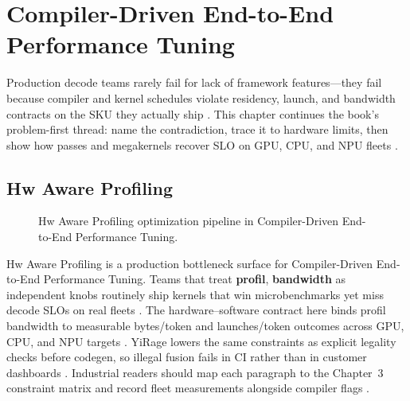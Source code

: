 \chapter{Compiler-Driven End-to-End Performance Tuning}
\label{chap:ch22}

Production decode teams rarely fail for lack of framework features---they fail because compiler and kernel schedules violate residency, launch, and bandwidth contracts on the SKU they actually ship \citep{patel2025llminference,nvidia2022hopper}. This chapter continues the book's problem-first thread: name the contradiction, trace it to hardware limits, then show how passes and megakernels recover SLO on GPU, CPU, and NPU fleets \citep{taxbreak2026,semianalysis2024tma}.

\section{Hw Aware Profiling}
\label{sec:hw_aware_profiling}
\begin{figure}[t]
\centering
{}
\caption{Hw Aware Profiling optimization pipeline in Compiler-Driven End-to-End Performance Tuning.}
\label{fig:hw_aware_profiling_pipeline}
\end{figure}


Hw Aware Profiling is a production bottleneck surface for Compiler-Driven End-to-End Performance Tuning. Teams that treat \textbf{profil}, \textbf{bandwidth} as independent knobs routinely ship kernels that win microbenchmarks yet miss decode SLOs on real fleets \citep{patel2025llminference,nvidia2022hopper}. The hardware--software contract here binds profil bandwidth to measurable bytes/token and launches/token outcomes across GPU, CPU, and NPU targets \citep{taxbreak2026,semianalysis2024tma}. YiRage lowers the same constraints as explicit legality checks before codegen, so illegal fusion fails in CI rather than in customer dashboards \citep{memoryfloor2026,amd2024xdna}. Industrial readers should map each paragraph to the Chapter~3 constraint matrix and record fleet measurements alongside compiler flags \citep{nvidia2022hopper,amd2024aie}.


